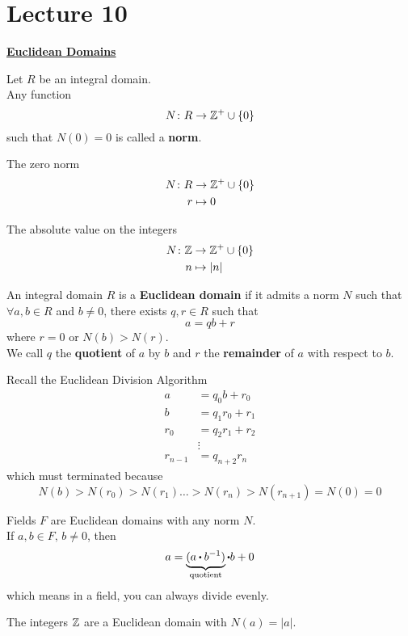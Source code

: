 \documentclass[../Main.tex]{subfiles}
\begin{document}
\chapter{Lecture 10}
\underline{\textbf{\Large Euclidean Domains}}
\begin{dfn}[title = Norm]
	Let $R$ be an integral domain.\\
	Any function
	\[N\colon R\to \mathbb{Z}^+\cup \{0\}\]
	such that $N(0)=0$ is called a \textbf{norm}.
\end{dfn}
\begin{example}
	The zero norm
	\begin{align*}
		N\colon R&\to \mathbb{Z}^+\cup \{0\} \\
		r&\mapsto 0
	\end{align*}
\end{example}
\begin{example}
	The absolute value on the integers
	\begin{align*}
	N\colon \mathbb{Z}&\to \mathbb{Z}^+\cup \{0\} \\
	n&\mapsto |n|
	\end{align*}
\end{example}
\begin{dfn}[title = {Euclidean Domain, Quotient, Remainder}]
	An integral domain $R$ is a \textbf{Euclidean domain} if it admits a norm $N$ such that $\forall a,b\in R$ and $b\ne 0$, there exists $q,r\in R$ such that
	\[a=qb+r\]
	where $r=0$ or $N(b)>N(r)$.\\
	We call $q$ the \textbf{quotient} of $a$ by $b$ and $r$ the \textbf{remainder} of $a$ with respect to $b$.
\end{dfn}
Recall the Euclidean Division Algorithm
\begin{align*}
a&=q_0b+r_0\\
b&=q_1r_0+r_1\\
r_0&=q_2r_1+r_2\\
&\vdots\\
r_{n-1}&=q_{n+2}r_n
\end{align*}
which must terminated because 
\[N(b)>N(r_0)>N(r_1)\dots >N(r_n)> N(r_{n+1})=N(0)=0 \]
\begin{example}
	Fields $F$ are Euclidean domains with any norm $N$.\\
	If $a,b\in F, \, b\ne0$, then
	\[a=\underbrace{(a\rdot b^{-1})}_{\text{quotient}}\rdot b+ 0 \]
	which means in a field, you can always divide evenly.
\end{example}
\begin{example}
	The integers $\mathbb{Z}$ are a Euclidean domain with $N(a)=|a|$.
\end{example}
\end{document}
